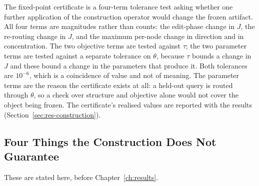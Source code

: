 The fixed-point certificate is a four-term tolerance test asking
whether one further application of the construction operator would
change the frozen artifact. All four terms are magnitudes rather than
counts: the edit-phase change in $J$, the re-routing change in $J$, and
the maximum per-node change in direction and in concentration. The two
objective terms are tested against $\tau$; the two parameter terms are
tested against a separate tolerance on $\theta$, because $\tau$ bounds
a change in $J$ and these bound a change in the parameters that produce
it. Both tolerances are $10^{-6}$, which is a coincidence of value and
not of meaning. The parameter terms are the reason the certificate
exists at all: a held-out query is routed through $\theta$, so a check
over structure and objective alone would not cover the object being
frozen. The certificate's realised values are reported with the results
(Section~\ref{sec:res-construction}).

\subsection{Four Things the Construction Does Not Guarantee}\label{sec:arch-limits}

These are stated here, before Chapter~\ref{ch:results}.

